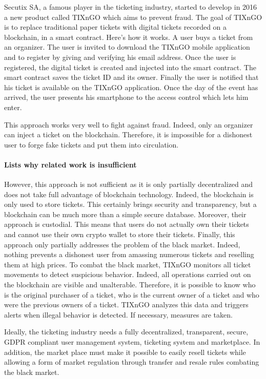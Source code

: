 \documentclass[a4paper,11pt,oneside]{report}
\begin{document}
Secutix SA, a famous player in the ticketing industry, started to develop in 2016 a new product called TIXnGO which aims to prevent fraud. The goal of TIXnGO is to replace traditional paper tickets with digital tickets recorded on a blockchain, in a smart contract. Here's how it works. A user buys a ticket from an organizer. The user is invited to download the TIXnGO mobile application and to register by giving and verifying his email address. Once the user is registered, the digital ticket is created and injected into the smart contract. The smart contract saves the ticket ID and its owner. Finally the user is notified that his ticket is available on the TIXnGO application. Once the day of the event has arrived, the user presents his smartphone to the access control which lets him enter.

This approach works very well to fight against fraud. Indeed, only an organizer can inject a ticket on the blockchain. Therefore, it is impossible for a dishonest user to forge fake tickets and put them into circulation.

\paragraph{Lists why related work is insufficient} However, this approach is not sufficient as it is only partially decentralized and does not take full advantage of blockchain technology. Indeed, the blockchain is only used to store tickets. This certainly brings security and transparency, but a blockchain can be much more than a simple secure database. Moreover, their approach is custodial. This means that users do not actually own their tickets and cannot use their own crypto wallet to store their tickets. Finally, this approach only partially addresses the problem of the black market. Indeed, nothing prevents a dishonest user from amassing numerous tickets and reselling them at high prices. To combat the black market, TIXnGO monitors all ticket movements to detect suspicious behavior. Indeed, all operations carried out on the blockchain are visible and unalterable. Therefore, it is possible to know who is the original purchaser of a ticket, who is the current owner of a ticket and who were the previous owners of a ticket. TIXnGO analyzes this data and triggers alerts when illegal behavior is detected. If necessary, measures are taken.

Ideally, the ticketing industry needs a fully decentralized, transparent, secure, GDPR compliant user management system, ticketing system and marketplace. In addition, the market place must make it possible to easily resell tickets while allowing a form of market regulation through transfer and resale rules combating the black market.
\end{document}
